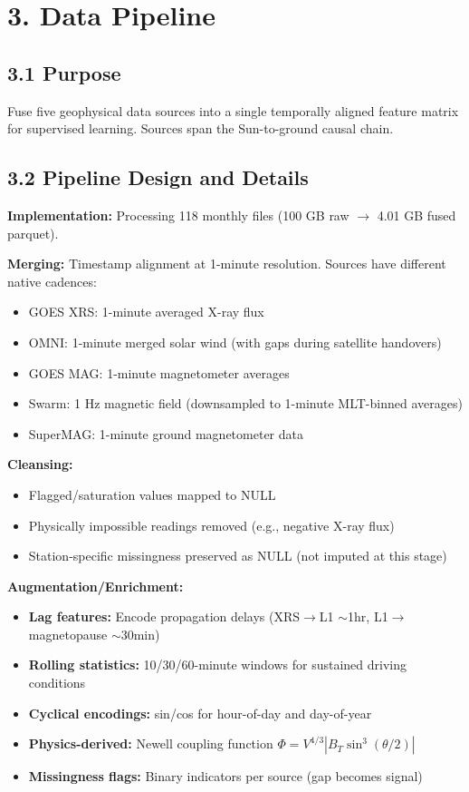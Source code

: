 \documentclass{article}
\begin{document}
\section*{3. Data Pipeline}

\subsection*{3.1 Purpose}

Fuse five geophysical data sources into a single temporally aligned feature matrix for supervised learning. Sources span the Sun-to-ground causal chain.

\subsection*{3.2 Pipeline Design and Details}

\textbf{Implementation:} Processing 118 monthly files (100 GB raw $\to$ 4.01 GB fused parquet).

\textbf{Merging:} Timestamp alignment at 1-minute resolution. Sources have different native cadences:
\begin{itemize}
  \item GOES XRS: 1-minute averaged X-ray flux
  \item OMNI: 1-minute merged solar wind (with gaps during satellite handovers)
  \item GOES MAG: 1-minute magnetometer averages
  \item Swarm: 1 Hz magnetic field (downsampled to 1-minute MLT-binned averages)
  \item SuperMAG: 1-minute ground magnetometer data
\end{itemize}

\textbf{Cleansing:} 
\begin{itemize}
  \item Flagged/saturation values mapped to NULL
  \item Physically impossible readings removed (e.g., negative X-ray flux)
  \item Station-specific missingness preserved as NULL (not imputed at this stage)
\end{itemize}

\textbf{Augmentation/Enrichment:}
\begin{itemize}
  \item \textbf{Lag features:} Encode propagation delays (XRS$\to$L1 $\sim$1hr, L1$\to$magnetopause $\sim$30min)
  \item \textbf{Rolling statistics:} 10/30/60-minute windows for sustained driving conditions
  \item \textbf{Cyclical encodings:} sin/cos for hour-of-day and day-of-year
  \item \textbf{Physics-derived:} Newell coupling function $\Phi = V^{4/3} |B_T \sin^3(\theta/2)|$
  \item \textbf{Missingness flags:} Binary indicators per source (gap becomes signal)
\end{itemize}
\end{document}
